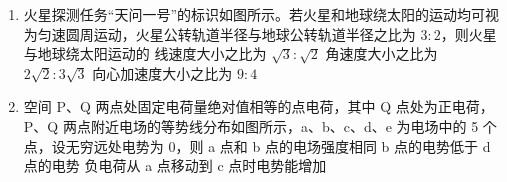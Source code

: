 \documentclass[\gkver]{gaokaozhenti}
\begin{document}
\begin{enumerate}
{B．由于 $v_{y}=\frac{Eq}{m}t=2v_{0}$，故粒子速度大小为 $v=\sqrt{v_{0}^{2}+v_{y}^{2}}=\sqrt{5}v_{0}$，故 B 错误；

C．由几何关系可知，到 P 点的距离为 $L=\sqrt{2}v_{0}t=\frac{2\sqrt{2}mv_{0}^{2}}{Eq}$，故 C 正确；

D．由于平抛推论可知，$\tan\alpha=2\tan\beta$，可知速度正切 $\tan\alpha=2\tan 45^{\circ}=2>\tan 60^{\circ}$，可知速度方向与竖直方向的夹角小于 $30^{\circ}$，故 D 错误。

故选 C。
}

\item
火星探测任务“天问一号”的标识如图所示。若火星和地球绕太阳的运动均可视为匀速圆周运动，火星公转轨道半径与地球公转轨道半径之比为 $3:2$，则火星与地球绕太阳运动的
{线速度大小之比为 $\sqrt{3}:\sqrt{2}$}
{角速度大小之比为 $2\sqrt{2}:3\sqrt{3}$}
{向心加速度大小之比为 $9:4$}

\item
空间 P、Q 两点处固定电荷量绝对值相等的点电荷，其中 Q 点处为正电荷，P、Q 两点附近电场的等势线分布如图所示，a、b、c、d、e 为电场中的 5 个点，设无穷远处电势为 0，则
\onepicture[w=5.5cm]{}
{a 点和 b 点的电场强度相同}
{b 点的电势低于 d 点的电势}
{负电荷从 a 点移动到 c 点时电势能增加}
\end{enumerate}
\end{document}
